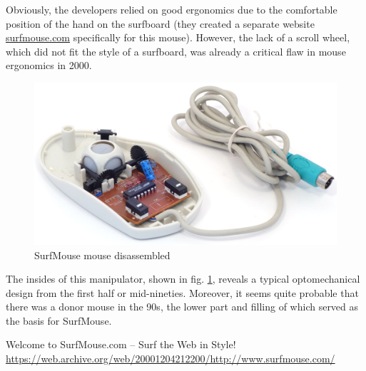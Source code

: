 \documentclass[11pt, a4paper]{article}
\begin{document}
Obviously, the developers relied on good ergonomics due to the comfortable position of the hand on the surfboard (they created a separate website \url{surfmouse.com} \cite{site} specifically for this mouse). However, the lack of a scroll wheel, which did not fit the style of a surfboard, was already a critical flaw in mouse ergonomics in 2000.

\begin{figure}[h]
    \centering
    \includegraphics[scale=0.6]{2000_surf_mouse/inside_60.jpg}
    \caption{SurfMouse mouse disassembled}
    \label{fig:SurfMouseInside}
\end{figure}

The insides of this manipulator, shown in fig. \ref{fig:SurfMouseInside}, reveals a typical optomechanical design from the first half or mid-nineties. Moreover, it seems quite probable that there was a donor mouse in the 90s, the lower part and filling of which served as the basis for SurfMouse.

\begin{thebibliography}{9}
     Welcome to SurfMouse.com -- Surf the Web in Style! \url{https://web.archive.org/web/20001204212200/http://www.surfmouse.com/}
\end{thebibliography}
\end{document}
